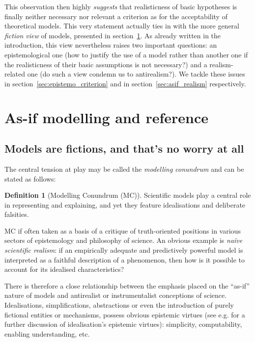 \documentclass[a4paper,11pt]{article}
\theoremstyle{definition}
\newtheorem{definition}{Definition}
\begin{document}
This observation then highly \textit{suggests} that realisticness of basic hypotheses is finally neither necessary nor relevant a criterion as for the acceptability of theoretical models. This very statement actually ties in with the more general \textit{fiction view} of models, presented in section~\ref{sec:asifVerifJust}. As already written in the introduction, this view nevertheless raises two important questions: an epistemological one (how to justify the use of a model rather than another one if the realisticness of their basic assumptions is not necessary?) and a realism-related one (do such a view condemn us to antirealism?). We tackle these issues in section~\ref{sec:epistemo_criterion} and in section~\ref{sec:asif_realism} respectively.

\section{As-if modelling and reference}
\label{sec:asifVerifJust}

\subsection{Models are fictions, and that's no worry at all}

The central tension at play may be called the \textit{modelling conundrum} and can be stated as follows:

\begin{definition}[Modelling Conundrum (MC)]
    Scientific models play a central role in representing and explaining, and yet they feature idealisations and deliberate falsities.
\label{def:conundrum}
\end{definition}

MC if often taken as a basis of a critique of truth-oriented positions in various sectors of epistemology and philosophy of science. An obvious example is \textit{naïve scientific realism}: if an empirically adequate and predictively powerful model is interpreted as a faithful description of a phenomenon, then how is it possible to account for its idealised characteristics?

There is therefore a close relationship between the emphasis placed on the ``as-if'' nature of models and antirealist or instrumentalist conceptions of science. Idealisations, simplifications, abstractions or even the introduction of purely fictional entities or mechanisms, possess obvious epistemic virtues (see e.g. \citep{Sullivan2019, Lawler2019, Nawar2019, Pincock2021} for a further discussion of idealisation's epistemic virtues): simplicity, computability, enabling understanding, etc. 
\end{document}
